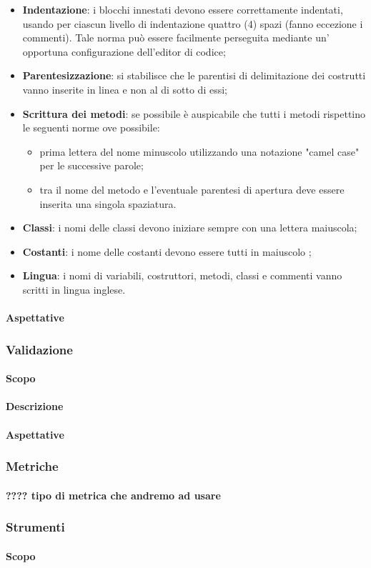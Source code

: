 \begin{itemize}
\item \textbf{Indentazione}: i blocchi innestati devono essere correttamente indentati, usando per ciascun livello di indentazione quattro (4) spazi (fanno eccezione i commenti).  Tale norma può essere facilmente perseguita mediante un' opportuna configurazione dell'editor di codice;
\item \textbf{Parentesizzazione}: si stabilisce che le parentisi di delimitazione dei costrutti vanno inserite in linea e non al di sotto di essi;
\item \textbf{Scrittura dei metodi}: se possibile è auspicabile che tutti i metodi rispettino le seguenti norme ove possibile:
\begin{itemize}
\item prima lettera del nome minuscolo utilizzando una notazione "camel case" per le successive parole;
\item tra il nome del metodo e l'eventuale parentesi di apertura deve essere inserita una singola spaziatura.
\end{itemize}
\item \textbf{Classi}: i nomi delle classi devono iniziare sempre con una lettera maiuscola;
\item \textbf{Costanti}: i nome delle costanti devono essere tutti in maiuscolo ;
\item \textbf{Lingua}: i nomi di variabili, costruttori, metodi, classi e commenti vanno scritti in lingua inglese.
\end{itemize}



\paragraph{Aspettative}

\subsubsection{Validazione}
\paragraph{Scopo}
\paragraph{Descrizione}
\paragraph{Aspettative}

\subsubsection{Metriche}
\paragraph{???? tipo di metrica che andremo ad usare}

\subsubsection{Strumenti}
\paragraph{Scopo}









